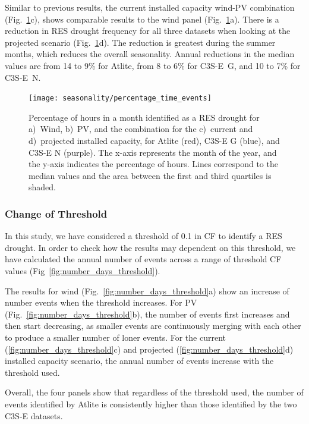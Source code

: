 \documentclass[a4paper, 11pt]{article}
\begin{document}
Similar to previous results, the current installed capacity wind-PV combination (Fig.~\ref{fig:res_droughts_seasonality}c), shows comparable results to the wind panel (Fig.~\ref{fig:res_droughts_seasonality}a). There is a reduction in RES drought frequency for all three datasets when looking at the projected scenario (Fig.~\ref{fig:res_droughts_seasonality}d). The reduction is greatest during the summer months, which reduces the overall seasonality. Annual reductions in the median values are from 14 to 9\% for Atlite, from 8 to 6\% for C3S-E~G, and 10 to 7\% for C3S-E~N.
 
\begin{figure}[!ht]
	\centering
	\texttt{[image: seasonality/percentage\_time\_events]}
	\caption{Percentage of hours in a month identified as a RES drought for a)~Wind, b)~PV, and the combination for the c)~current and d)~projected installed capacity, for Atlite (red), C3S-E G (blue), and C3S-E N (purple). The x-axis represents the month of the year, and the y-axis indicates the percentage of hours. Lines correspond to the median values and the area between the first and third quartiles is shaded.}
	\label{fig:res_droughts_seasonality}
\end{figure}

\newpage
\subsubsection{Change of Threshold}

In this study, we have considered a threshold of 0.1 in CF to identify a RES drought. In order to check how the results may dependent on this threshold, we have calculated the annual number of events across a range of threshold CF values (Fig~\ref{fig:number_days_threshold}).

The results for wind (Fig.~\ref{fig:number_days_threshold}a) show an increase of number events when the threshold increases. For PV (Fig.~\ref{fig:number_days_threshold}b), the number of events first increases and then start decreasing, as smaller events are continuously merging with each other to produce a smaller number of loner events. For the current (\ref{fig:number_days_threshold}c) and projected (\ref{fig:number_days_threshold}d) installed capacity scenario, the annual number of events increase with the threshold used.

Overall, the four panels show that regardless of the threshold used, the number of events identified by Atlite is consistently higher than those identified by the two C3S-E datasets.
\end{document}

